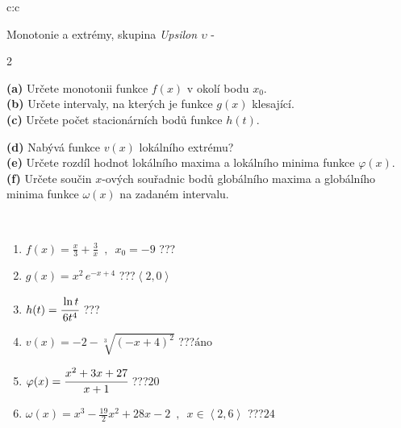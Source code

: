 \documentclass[10pt]{report}
\begin{document}
\newpage
\thispagestyle{empty}
\begin{tabular}{c:c}
\begin{minipage}[c][104.5mm][t]{0.5\linewidth}
\begin{center}
\vspace{7mm}
{\huge Monotonie a extrémy, skupina \textit{Upsilon $\upsilon$} -}\\[5mm]
\begin{minipage}{0.95\linewidth}
\begin{center}
{\small \begin{multicols}{2} \raggedright
\textbf{(a)} Určete monotonii funkce \(f(x)\) v okolí bodu \(x_0\). \\[1mm]
\textbf{(b)} Určete intervaly, na kterých je funkce \(g(x)\) klesající. \\[1mm]
\textbf{(c)} Určete počet stacionárních bodů funkce \(h(t)\). \par \columnbreak
\textbf{(d)} Nabývá funkce \(v(x)\) lokálního extrému? \\[1mm]
\textbf{(e)} Určete rozdíl hodnot lokálního maxima a lokálního minima funkce \(\varphi(x)\). \\[1mm]
\textbf{(f)} Určete součin \(x\)-ových souřadnic bodů globálního maxima a globálního minima funkce \(\omega(x)\) na zadaném intervalu. \\[1mm]
\end{multicols}
}
\end{center}
\end{minipage}
\\[4mm]
\begin{minipage}{0.79\linewidth}
\begin{center}
\begin{varwidth}{\linewidth}
\begin{enumerate}
\normalsize
\item $f(x)=\frac{x}{3}+\frac{3}{x} \enspace , \enspace x_0=-9$\quad \dotfill\; ???\;\dotfill \quad {}
\item $g(x)=x^2\, e^{-x+4}$\quad \dotfill\; ???\;\dotfill \quad $\left\langle2 , 0\right\rangle$
\item $h(t)=\cfrac{\ln t}{6t^4}$\quad \dotfill\; ???\;\dotfill {}
\item $v(x)=-2-\sqrt[3]{(-x+4)^2}$\quad \dotfill\; ???\;\dotfill \quad $\text{áno}$
\item $\varphi(x)=\cfrac{x^2+3x+27}{x+1}$\quad \dotfill\; ???\;\dotfill \quad $20$
\item $\omega(x)=x^3-\frac{19}{2}x^2+28x-2 \enspace , \enspace x\in\left\langle2 , 6\right\rangle$\quad \dotfill\; ???\;\dotfill \quad $24$

\end{enumerate}
\end{varwidth}
\end{center}
\end{minipage}
\end{center}
\end{minipage}
\end{tabular}
\end{document}
